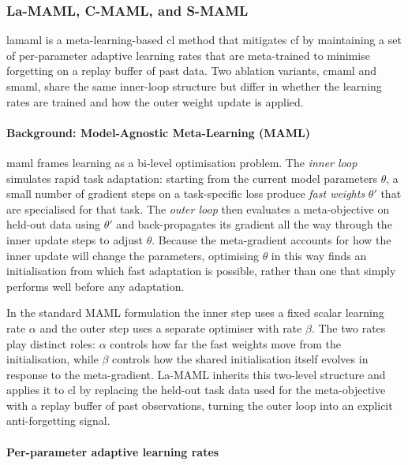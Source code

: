 \subsubsection{La-MAML, C-MAML, and S-MAML}

\gls{lamaml} \cite{ll_lamaml_2020} is a meta-learning-based \gls{cl} method that mitigates \gls{cf} by maintaining a set of per-parameter adaptive learning rates that are meta-trained to minimise forgetting on a replay buffer of past data. Two ablation variants, \gls{cmaml} and \gls{smaml}, share the same inner-loop structure but differ in whether the learning rates are trained and how the outer weight update is applied.

\paragraph{Background: Model-Agnostic Meta-Learning (MAML)}

\gls{maml} \cite{maml_2017} frames learning as a bi-level optimisation problem. The \emph{inner loop} simulates rapid task adaptation: starting from the current model parameters $\theta$, a small number of gradient steps on a task-specific loss produce \emph{fast weights} $\theta'$ that are specialised for that task. The \emph{outer loop} then evaluates a meta-objective on held-out data using $\theta'$ and back-propagates its gradient all the way through the inner update steps to adjust $\theta$. Because the meta-gradient accounts for how the inner update will change the parameters, optimising $\theta$ in this way finds an initialisation from which fast adaptation is possible, rather than one that simply performs well before any adaptation.

In the standard MAML formulation the inner step uses a fixed scalar learning rate $\alpha$ and the outer step uses a separate optimiser with rate $\beta$. The two rates play distinct roles: $\alpha$ controls how far the fast weights move from the initialisation, while $\beta$ controls how the shared initialisation itself evolves in response to the meta-gradient. La-MAML inherits this two-level structure and applies it to \gls{cl} by replacing the held-out task data used for the meta-objective with a replay buffer of past observations, turning the outer loop into an explicit anti-forgetting signal.

\paragraph{Per-parameter adaptive learning rates}

